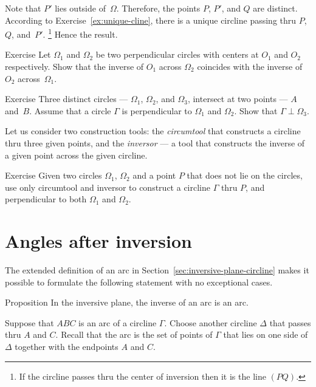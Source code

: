 Note that $P'$ lies outside of~$\Omega$.
Therefore, the points $P$, $P'$, and $Q$ are distinct.
According to Exercise~\ref{ex:unique-cline},
there is a unique circline passing thru $P$, $Q$, and~$P'$.%
\footnote{If the circline passes thru the center of inversion then it is the line $(PQ)$.}
Hence the result.
\qeds

\begin{thm}{Exercise}\label{ex:centers-of-perp-circles}
Let $\Omega_1$ and $\Omega_2$ be two perpendicular circles with centers at $O_1$ and $O_2$ respectively.
Show that the inverse of $O_1$ across $\Omega_2$ 
coincides with 
the inverse of $O_2$ across~$\Omega_1$.
\end{thm}

\begin{thm}{Exercise}\label{ex:4-th-perp-circ}
Three distinct circles --- $\Omega_1$, $\Omega_2$, and $\Omega_3$, intersect at two points --- $A$ and~$B$.
Assume that a circle $\Gamma$ is perpendicular to $\Omega_1$ and $\Omega_2$.
Show that $\Gamma\perp\Omega_3$.
\end{thm}

Let us consider two construction tools:
the \emph{circumtool} that constructs a circline thru three given points, 
and the \emph{inversor} --- a tool that constructs the inverse of a given point across the given circline.

\begin{thm}{Exercise}\label{ex:construction-perp-clines}
Given  two circles $\Omega_1$, $\Omega_2$ and a point $P$ that does not lie on the circles,
use only circumtool and inversor to construct a circline $\Gamma$ thru $P$, 
and perpendicular to both $\Omega_1$ and $\Omega_2$.
\end{thm}

\section{Angles after inversion}


The extended definition of an arc in Section~\ref{sec:inversive-plane-circline} makes it possible to formulate the following statement with no exceptional cases.

\begin{thm}{Proposition}
In the inversive plane, the inverse of an arc is an arc.

\end{thm}

Suppose that $ABC$ is an arc of a circline $\Gamma$.
Choose another circline $\Delta$ that passes thru $A$ and $C$.
Recall that the arc is the set of points of $\Gamma$ that lies on one side of $\Delta$ together with the endpoints $A$ and $C$.

